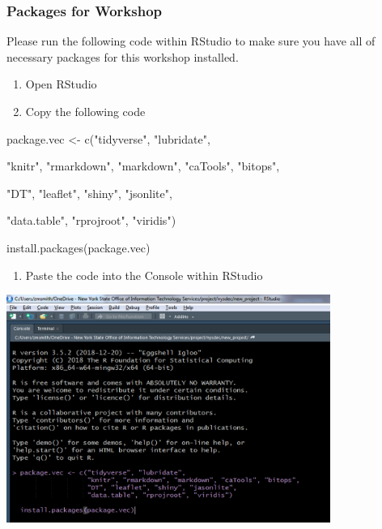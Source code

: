 \documentclass[
  letterpaper,
  DIV=11,
  numbers=noendperiod]{scrreprt}
\newenvironment{Shaded}{\begin{snugshade}}{\end{snugshade}}
\newcommand{\FunctionTok}[1]{\textcolor[rgb]{0.28,0.35,0.67}{#1}}
\newcommand{\NormalTok}[1]{\textcolor[rgb]{0.00,0.23,0.31}{#1}}
\newcommand{\OtherTok}[1]{\textcolor[rgb]{0.00,0.23,0.31}{#1}}
\newcommand{\StringTok}[1]{\textcolor[rgb]{0.13,0.47,0.30}{#1}}
\providecommand{\tightlist}{%
  \setlength{\itemsep}{0pt}\setlength{\parskip}{0pt}}\usepackage{longtable,booktabs,array}
\begin{document}
\hypertarget{packages-for-workshop}{%
\subsubsection{Packages for Workshop}\label{packages-for-workshop}}

Please run the following code within RStudio to make sure you have all
of necessary packages for this workshop installed.

\begin{enumerate}
\def\labelenumi{\arabic{enumi}.}
\item
  Open RStudio
\item
  Copy the following code
\end{enumerate}

\begin{Shaded}
\begin{Highlighting}[]
\NormalTok{package.vec }\OtherTok{\textless{}{-}} \FunctionTok{c}\NormalTok{(}\StringTok{"tidyverse"}\NormalTok{, }\StringTok{"lubridate"}\NormalTok{,}

\StringTok{"knitr"}\NormalTok{, }\StringTok{"rmarkdown"}\NormalTok{, }\StringTok{"markdown"}\NormalTok{, }\StringTok{"caTools"}\NormalTok{, }\StringTok{"bitops"}\NormalTok{,}

\StringTok{"DT"}\NormalTok{, }\StringTok{"leaflet"}\NormalTok{, }\StringTok{"shiny"}\NormalTok{, }\StringTok{"jsonlite"}\NormalTok{,}

\StringTok{"data.table"}\NormalTok{, }\StringTok{"rprojroot"}\NormalTok{, }\StringTok{"viridis"}\NormalTok{)}

\FunctionTok{install.packages}\NormalTok{(package.vec)}
\end{Highlighting}
\end{Shaded}

\begin{enumerate}
\def\labelenumi{\arabic{enumi}.}
\setcounter{enumi}{2}
\tightlist
\item
  Paste the code into the Console within RStudio
\end{enumerate}

\includegraphics[width=4.16667in,height=\textheight]{images/installation_updates/install_packages.png}
\end{document}
